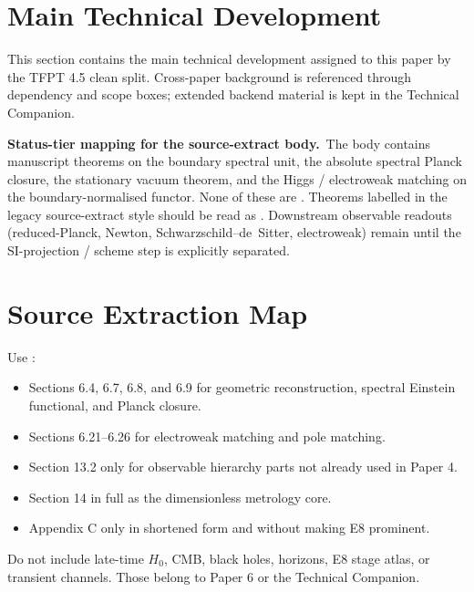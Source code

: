 \clearpage
\section{Main Technical Development}

This section contains the main technical development assigned to this paper by the TFPT 4.5 clean split. Cross-paper background is referenced through dependency and scope boxes; extended backend material is kept in the Technical Companion.

\begin{tfptwarningbox}
\textbf{Status-tier mapping for the source-extract body.}\
The body contains  manuscript theorems on the boundary
spectral unit, the absolute spectral Planck closure, the
stationary vacuum theorem, and the Higgs / electroweak matching
on the boundary-normalised functor. None of these are .
Theorems labelled  in the legacy source-extract style
should be read as . Downstream observable readouts
(reduced-Planck, Newton, Schwarzschild--de~Sitter, electroweak)
remain  until the SI-projection / scheme step is
explicitly separated.
\end{tfptwarningbox}

\tfptDraftXrefNotice



\section{Source Extraction Map}

\begin{tfptsourcebox}
Use \sourceDraft:
\begin{itemize}[leftmargin=1.5em]
    \item Sections 6.4, 6.7, 6.8, and 6.9 for geometric reconstruction, spectral Einstein
    functional, and Planck closure.
    \item Sections 6.21--6.26 for electroweak matching and pole matching.
    \item Section 13.2 only for observable hierarchy parts not already used in Paper 4.
    \item Section 14 in full as the dimensionless metrology core.
    \item Appendix C only in shortened form and without making E8 prominent.
\end{itemize}
\end{tfptsourcebox}

\begin{tfptwarningbox}
Do not include late-time $H_0$, CMB, black holes, horizons, E8 stage atlas, or transient channels.
Those belong to Paper 6 or the Technical Companion.
\end{tfptwarningbox}


